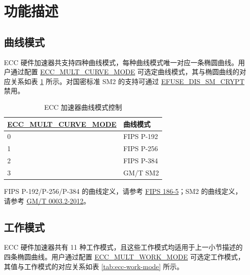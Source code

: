 \documentclass[main\_\_CN.tex]{subfiles}
\begin{document}
\section{功能描述}
\label{sec:ecc-mode-config}
\subsection{曲线模式}

\chipname{} ECC 硬件加速器共支持四种曲线模式，每种曲线模式唯一对应一条椭圆曲线。用户通过配置 \hyperref[fielddesc:ECCMULTCURVEMODE]{ECC\_MULT\_CURVE\_MODE} 可选定曲线模式，其与椭圆曲线的对应关系如表 \ref{tab:ecc-curve-mode} 所示。对国密标准 SM2 的支持可通过 \hyperref[fielddesc:EFUSEDISSMCRYPT]{EFUSE\_DIS\_SM\_CRYPT} 禁用。


\begin{table}[H]
    \centering
    \caption{ECC 加速器曲线模式控制}
    \label{tab:ecc-curve-mode}
    \begin{threeparttable}
    \begin{tabular}{|p{4.2cm}|p{3.6cm}|}
    \hline
        \rowcolor{lightgray}
        \textbf{\hyperref[fielddesc:ECCMULTCURVEMODE]{ECC\_MULT\_CURVE\_MODE}} & \textbf{曲线模式\tnote{*}} \\ \hline
        0 & FIPS P-192  \\\hline
        1 & FIPS P-256  \\\hline
        2 & FIPS P-384  \\\hline
        3 & GM/T SM2  \\\hline
    \end{tabular}
    \begin{tablenotes}
        \item[*] FIPS P-192/P-256/P-384 的曲线定义，请参考 \href{https://nvlpubs.nist.gov/nistpubs/FIPS/NIST.FIPS.186-5.pdf}{FIPS 186-5}；SM2 的曲线定义，请参考 \href{http://www.gmbz.org.cn/file/2018-01-08/f60d13a3-e0fd-40d8-a80f-13fde691ef03.pdf}{GM/T 0003.2-2012}。
    \end{tablenotes}
    \end{threeparttable}
\end{table}

\subsection{工作模式}
\label{sec:ecc-work-mode}

\chipname{} ECC 硬件加速器共有 11 种工作模式，且这些工作模式均适用于上一小节描述的四条椭圆曲线。用户通过配置 \hyperref[fielddesc:ECCMULTWORKMODE]{ECC\_MULT\_WORK\_MODE} 可选定工作模式，其值与工作模式的对应关系如表 \ref{tab:ecc-work-mode} 所示。
\end{document}
